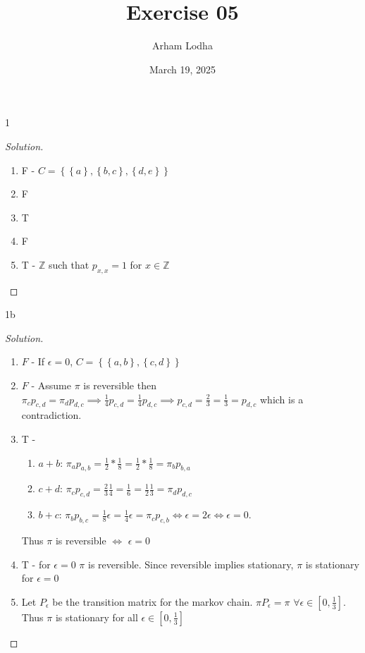 \documentclass{article}
\newcommand{\Z}{\mathbb{Z}}
\newenvironment{solution}
{\renewcommand\qedsymbol{$\blacksquare$}\begin{proof}[Solution]}
{\end{proof}}
\begin{document}
\title{Exercise 05}
\author{Arham Lodha}%
\date{March 19, 2025}%
\maketitle

\begin{PROB}{1}\label{Problem 1.}
\end{PROB}
\begin{solution}
    \begin{enumerate}
        \item F - $C = \left\{ \left\{ a \right\}, \left\{ b, c \right\}, \left\{ d, e \right\} \right\}$ 
        \item F
        \item T
        \item F
        \item T - $\Z$ such that $p_{x, x} = 1$ for $x \in \Z$   
    \end{enumerate}
    
\end{solution}

\begin{PROB}{1b}\label{Problem 1b.}
\end{PROB}
\begin{solution}
    \begin{enumerate}
        \item $F$ - If $\epsilon = 0$, $C = \left\{ \left\{ a, b \right\}, \left\{ c, d \right\} \right\}$
        \item $F$ - Assume $\pi$ is reversible then  $\pi_c p_{c,d} = \pi_d p_{d, c} \implies \frac{1}{4} p_{c, d} = \frac{1}{4} p_{d, c} \implies p_{c, d} = \frac{2}{3} = \frac{1}{3}= p_{d, c}$ which is a contradiction. 
        \item T -
        
        \begin{enumerate}
            \item $a + b$: $\pi_a p_{a, b}= \frac{1}{2} * \frac{1}{8} = \frac{1}{2} * \frac{1}{8} = \pi_b p_{b, a}$ 
            \item $c + d$: $\pi_c p_{c, d} = \frac{2}{3} \frac{1}{4} = \frac{1}{6} = \frac{1}{2} \frac{1}{3} = \pi_d p_{d, c}$
            \item $b + c$: $\pi_b p_{b, c} = \frac{1}{8} \epsilon = \frac{1}{4} \epsilon = \pi_c p_{c, b} \iff \epsilon = 2\epsilon \iff \epsilon = 0$.    
        \end{enumerate}

        Thus $\pi$ is reversible $\iff$ $\epsilon = 0$   
        
        
        \item T - for $\epsilon = 0$ $\pi$ is reversible. Since reversible implies stationary, $\pi$ is stationary for $\epsilon = 0$
        \item Let $P_{\epsilon}$ be the transition matrix for the markov chain. $\pi P_\epsilon = \pi$ $\forall \epsilon \in [0, \frac{1}{3}]$. Thus $\pi$ is stationary for all $\epsilon \in [0, \frac{1}{3}]$       
    \end{enumerate}
    
\end{solution}
\end{document}
